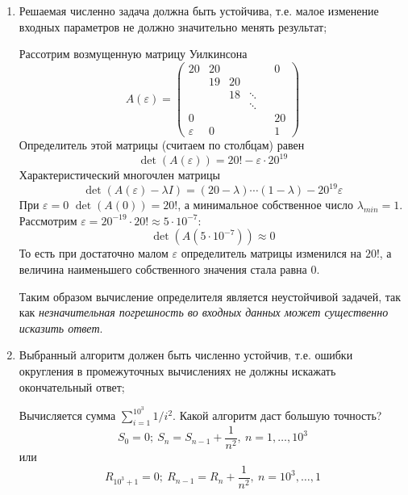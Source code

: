\begin{enumerate}
  \item Решаемая численно задача должна быть устойчива, т.е. малое
        изменение входных параметров не должно значительно менять результат;
        \begin{example}
          Рассотрим возмущенную матрицу Уилкинсона
          \[
            A(\varepsilon)=\left(\begin{array}{cccccc}
                20          & 20 &    &        &  & 0  \\
                            & 19 & 20 &        &  &    \\
                            &    & 18 & \ddots &  &    \\
                            &    &    & \ddots &  &    \\
                0           &    &    &        &  & 20 \\
                \varepsilon & 0  &    &        &  & 1
              \end{array}\right)
          \]
          Определитель этой матрицы (считаем по столбцам) равен
          \[\det(A(\varepsilon))=20!-\varepsilon\cdot20^{19}\]
          Характеристический многочлен матрицы
          \[\det(A(\varepsilon)-\lambda I)=(20-\lambda)\cdots(1-\lambda) - 20^{19}\varepsilon\]
          При $\varepsilon=0$ $\det(A(0))=20!$, а минимальное собственное число $\lambda_{min}=1$.
          Рассмотрим $\varepsilon=20^{-19}\cdot20!\approx5\cdot10^{-7}$:
          \[\det(A(5\cdot10^{-7}))\approx0\]
          То есть при достаточно малом $\varepsilon$ определитель
          матрицы изменился на $20!$, а величина наименьшего собственного значения стала равна $0$.

          Таким образом вычисление определителя является неустойчивой задачей,
          так как \textit{незначительная погрешность во входных данных может
            существенно исказить ответ}.
        \end{example}
  \item Выбранный алгоритм должен быть численно устойчив, т.е.
        ошибки округления в промежуточных вычислениях не должны искажать
        окончательный ответ;
        \begin{example}
          Вычисляется сумма $\sum_{i=1}^{10^3}1/i^2$. Какой алгоритм даст большую точность?
          \[S_0=0;\ S_n=S_{n-1}+\frac{1}{n^2},\ n=1,\ldots,10^3\]
          или
          \[R_{10^3+1}=0;\ R_{n-1}=R_n+\frac{1}{n^2},\ n=10^3,\ldots,1\]


\end{example}
\end{enumerate}
